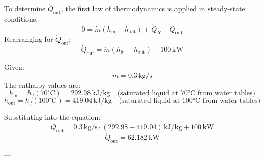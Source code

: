 To determine \( \dot{Q}_{\text{out}} \), the first law of thermodynamics is applied in steady-state conditions:  
\[
0 = \dot{m} \left( h_{\text{in}} - h_{\text{out}} \right) + \dot{Q}_R - \dot{Q}_{\text{out}}
\]  
Rearranging for \( \dot{Q}_{\text{out}} \):  
\[
\dot{Q}_{\text{out}} = \dot{m} \left( h_{\text{in}} - h_{\text{out}} \right) + 100 \, \text{kW}
\]  

Given:  
\[
\dot{m} = 0.3 \, \text{kg/s}
\]  
The enthalpy values are:  
\[
h_{\text{in}} = h_f(70^\circ\text{C}) = 292.98 \, \text{kJ/kg} \quad \text{(saturated liquid at 70°C from water tables)}
\]  
\[
h_{\text{out}} = h_f(100^\circ\text{C}) = 419.04 \, \text{kJ/kg} \quad \text{(saturated liquid at 100°C from water tables)}
\]  

Substituting into the equation:  
\[
\dot{Q}_{\text{out}} = 0.3 \, \text{kg/s} \cdot \left( 292.98 - 419.04 \right) \, \text{kJ/kg} + 100 \, \text{kW}
\]  
\[
\dot{Q}_{\text{out}} = 62.182 \, \text{kW}
\]  

---
